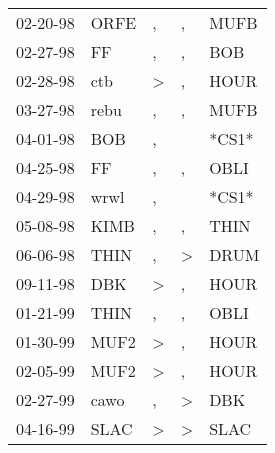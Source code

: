 \begin{supertabular}{p{0.07\textwidth}p{0.06\textwidth}p{0.02\textwidth}p{0.02\textwidth}p{0.06\textwidth}}
          02-20-98\textsuperscript{} &           ORFE\textsuperscript{} &             , &             , &  MUFB\textsuperscript{} \\
          02-27-98\textsuperscript{} &             FF\textsuperscript{} &             , &             , &   BOB\textsuperscript{} \\
          02-28-98\textsuperscript{} &            ctb\textsuperscript{} &  \textgreater &             , &  HOUR\textsuperscript{} \\
          03-27-98\textsuperscript{} &           rebu\textsuperscript{} &             , &             , &  MUFB\textsuperscript{} \\
          04-01-98\textsuperscript{} &            BOB\textsuperscript{} &             , &               &                   *CS1* \\
          04-25-98\textsuperscript{} &             FF\textsuperscript{} &             , &             , &  OBLI\textsuperscript{} \\
          04-29-98\textsuperscript{} &           wrwl\textsuperscript{} &             , &               &                   *CS1* \\
          05-08-98\textsuperscript{} &           KIMB\textsuperscript{} &             , &             , &  THIN\textsuperscript{} \\
          06-06-98\textsuperscript{} &           THIN\textsuperscript{} &             , &  \textgreater &  DRUM\textsuperscript{} \\
          09-11-98\textsuperscript{} &            DBK\textsuperscript{} &  \textgreater &             , &  HOUR\textsuperscript{} \\
          01-21-99\textsuperscript{} &           THIN\textsuperscript{} &             , &             , &  OBLI\textsuperscript{} \\
          01-30-99\textsuperscript{} &           MUF2\textsuperscript{} &  \textgreater &             , &  HOUR\textsuperscript{} \\
          02-05-99\textsuperscript{} &           MUF2\textsuperscript{} &  \textgreater &             , &  HOUR\textsuperscript{} \\
          02-27-99\textsuperscript{} &           cawo\textsuperscript{} &             , &  \textgreater &   DBK\textsuperscript{} \\
          04-16-99\textsuperscript{} &           SLAC\textsuperscript{} &  \textgreater &  \textgreater &  SLAC\textsuperscript{} \\

\end{supertabular}
